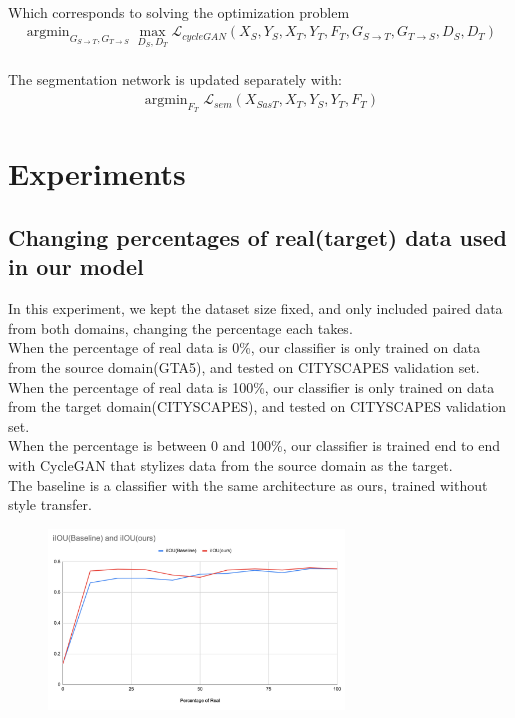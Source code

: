 \documentclass{article}
\DeclareMathOperator*{\argmin}{argmin}
\begin{document}
\\Which corresponds to solving the optimization problem\\
\begin{align*}
\argmin_{G_{S\rightarrow T}, G_{T\rightarrow S}} \max_{D_S, D_T}  \mathcal{L}_{cycleGAN}(X_S, Y_S, X_T, Y_T, F_T, G_{S\rightarrow T}, G_{T\rightarrow S}, D_S, D_T) 
\end{align*}
\\The segmentation network is updated separately with:\\
\begin{align*}
\argmin_{F_T} \mathcal{L}_{sem}( X_{SasT}, X_T, Y_S, Y_T, F_T) 
\end{align*}

\section{Experiments}
\subsection{Changing percentages of real(target) data used in our model}
In this experiment, we kept the dataset size fixed, and only included paired data from both domains, changing the percentage each takes.\\
When the percentage of real data is 0\%, our classifier is only trained on data from the source domain(GTA5), and tested on CITYSCAPES validation set.\\
When the percentage of real data is 100\%, our classifier is only trained on data from the target domain(CITYSCAPES), and tested on CITYSCAPES validation set.\\
When the percentage is between 0 and 100\%, our classifier is trained end to end with CycleGAN that stylizes data from the source domain as the target.\\
The baseline is a classifier with the same architecture as ours, trained without style transfer.\\
\begin{figure}[H]
    \centering
\includegraphics[width=0.7\textwidth]{figures/real_p.png}\\
\end{figure}
\end{document}
